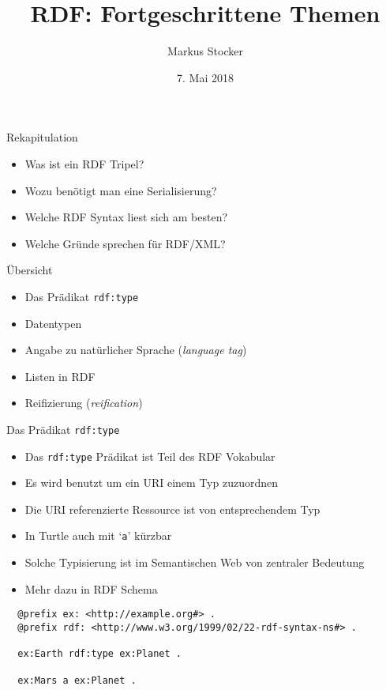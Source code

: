 \documentclass{beamer}
\title{RDF: Fortgeschrittene Themen}
\author{Markus Stocker}
\date{7. Mai 2018}
\begin{document}
\maketitle

\begin{frame}{Rekapitulation}
	
	\begin{itemize}
		\item Was ist ein RDF Tripel?
		\item Wozu benötigt man eine Serialisierung?
		\item Welche RDF Syntax liest sich am besten?
		\item Welche Gründe sprechen für RDF/XML?
	\end{itemize}
	
\end{frame}

\begin{frame}{Übersicht}
	
	\begin{itemize}
		\item Das Prädikat \texttt{rdf:type}
		\item Datentypen
		\item Angabe zu natürlicher Sprache (\emph{language tag})
		\item Listen in RDF
		\item Reifizierung (\emph{reification})
	\end{itemize}
	
\end{frame}

\begin{frame}[fragile]{Das Prädikat \texttt{rdf:type}}
	
	\begin{itemize}
		\item Das \texttt{rdf:type} Prädikat ist Teil des RDF Vokabular
		\item Es wird benutzt um ein URI einem Typ zuzuordnen
		\item Die URI referenzierte Ressource ist von entsprechendem Typ
		\item In Turtle auch mit `\texttt{a}' kürzbar
		\item Solche Typisierung ist im Semantischen Web von zentraler Bedeutung
		\item Mehr dazu in RDF Schema
	\end{itemize}
	
	\small
	\begin{lstlisting}
  @prefix ex: <http://example.org#> .
  @prefix rdf: <http://www.w3.org/1999/02/22-rdf-syntax-ns#> .
    
  ex:Earth rdf:type ex:Planet .
  
  ex:Mars a ex:Planet . 
	\end{lstlisting}
	
\end{frame}
\end{document}
